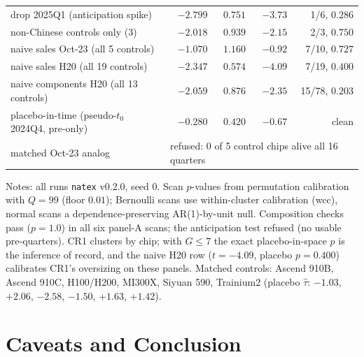 \documentclass[11pt]{article}
\newcommand{\natex}{\texttt{natex}}
\begin{document}
\begin{table}[t]
\begin{tabular}{lrrrr}
\quad drop 2025Q1 (anticipation spike) & $-2.799$ & $0.751$ & $-3.73$ & 1/6, $0.286$ \\
\quad non-Chinese controls only (3) & $-2.018$ & $0.939$ & $-2.15$ & 2/3, $0.750$ \\
naive sales Oct-23 (all 5 controls) & $-1.070$ & $1.160$ & $-0.92$ & 7/10, $0.727$ \\
naive sales H20 (all 19 controls) & $-2.347$ & $0.574$ & $-4.09$ & 7/19, $0.400$ \\
naive components H20 (all 13 controls) & $-2.059$ & $0.876$ & $-2.35$ & 15/78, $0.203$ \\
placebo-in-time (pseudo-$t_0$ 2024Q4, pre-only) & $-0.280$ & $0.420$ & $-0.67$ & clean \\
matched Oct-23 analog & \multicolumn{4}{l}{refused: 0 of 5 control chips alive all 16 quarters} \\
\bottomrule
\end{tabular}

\medskip
\parbox{0.95\textwidth}{\footnotesize Notes: all runs \natex{} v0.2.0, seed
0. Scan $p$-values from permutation calibration with $Q=99$ (floor $0.01$);
Bernoulli scans use within-cluster calibration (wcc), normal scans a
dependence-preserving AR(1)-by-unit null. Composition checks pass ($p=1.0$)
in all six panel-A scans; the anticipation test refused (no usable
pre-quarters). CR1 clusters by chip; with $G\leq 7$ the exact
placebo-in-space $p$ is the inference of record, and the naive H20 row
($t=-4.09$, placebo $p=0.400$) calibrates CR1's oversizing on these panels.
Matched controls: Ascend 910B, Ascend 910C, H100/H200, MI300X, Siyuan 590,
Trainium2 (placebo $\hat\tau$: $-1.03$, $+2.06$, $-2.58$, $-1.50$, $+1.63$,
$+1.42$).}
\end{table}

\section{Caveats and Conclusion}\label{sec:conclusion}
\end{document}
